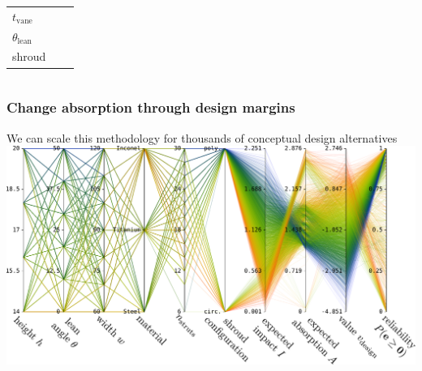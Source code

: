 \begin{frame}[t,noframenumbering]
\begin{columns}[t]
\begin{column}{.5\textwidth}
            \vspace{-2em}
            \begin{table}[h!]
                \centering
                \renewcommand{\arraystretch}{0.9}%
                \small\addtolength{\tabcolsep}{-5pt}
                \begin{tabular}{C{1cm}C{2.5cm}C{2.5cm}}
                $t_\text{vane}$         &  &  \\
                $\theta_\text{lean}$    &  &  \\ 
                shroud                  &  &  \\
                \end{tabular}
            
            \end{table}

		\end{column}
		
		\begin{column}{.5\textwidth} %
		\end{column}
	\end{columns}
\end{frame}
\begin{frame}[t,noframenumbering]
	\frametitle{Change absorption through design margins}
    We can scale this methodology for thousands of conceptual design alternatives
    \centering\includegraphics[width=0.8\linewidth]{images/design_space_exploration/PCPlot_stochastic.pdf}
\end{frame}